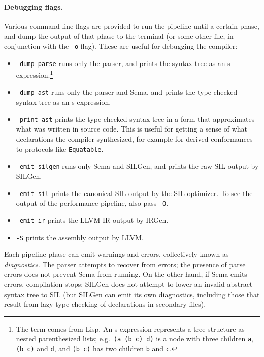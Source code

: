 \documentclass[../generics]{subfiles}
\begin{document}
\paragraph{Debugging flags.}
Various command-line flags are provided to run the pipeline until a certain phase, and dump the output of that phase to the terminal (or some other file, in conjunction with the \texttt{-o} flag). These are useful for debugging the compiler:
\begin{itemize}
\item {}\texttt{-dump-parse} runs only the parser, and prints the syntax tree as an s-expression.\footnote{The term comes from Lisp. An s-expression represents a tree structure as nested parenthesized lists; e.g.\ \texttt{(a (b c) d)} is a node with three children \texttt{a}, \texttt{(b c)} and \texttt{d}, and \texttt{(b c)} has two children \texttt{b} and \texttt{c}.}
\item {}\texttt{-dump-ast} runs only the parser and Sema, and prints the type-checked syntax tree as an s-expression.
\item {}\texttt{-print-ast} prints the type-checked syntax tree in a form that approximates what was written in source code. This is useful for getting a sense of what declarations the compiler synthesized, for example for derived conformances to protocols like \texttt{Equatable}.
\item {}\texttt{-emit-silgen} runs only Sema and SILGen, and prints the raw SIL output by SILGen.
\item {}\texttt{-emit-sil} prints the canonical SIL output by the SIL optimizer. To see the output of the performance pipeline, also pass \texttt{-O}.
\item {}\texttt{-emit-ir} prints the LLVM IR output by IRGen.
\item {}\texttt{-S} prints the assembly output by LLVM.
\end{itemize}

Each pipeline phase can emit warnings and errors, collectively known as \emph{diagnostics}. The parser attempts to recover from errors; the presence of parse errors does not prevent Sema from running. On the other hand, if Sema emits errors, compilation stops; SILGen does not attempt to lower an invalid abstract syntax tree to SIL (but SILGen can emit its own diagnostics, including those that result from lazy type checking of declarations in secondary files).
\end{document}
